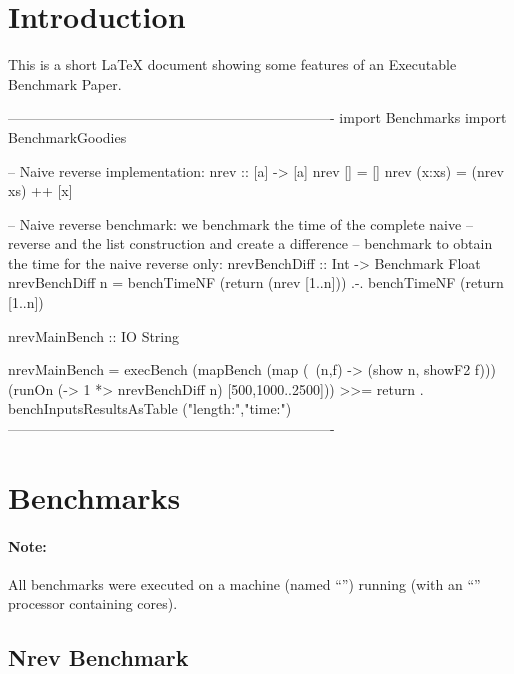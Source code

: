 \documentclass{article}
\begin{document}
\sloppy

\section{Introduction}

This is a short LaTeX document showing some features of an
Executable Benchmark Paper.

\begin{curryprog}
----------------------------------------------------------------------
import Benchmarks
import BenchmarkGoodies

-- Naive reverse implementation:
nrev :: [a] -> [a]
nrev []     = []
nrev (x:xs) = (nrev xs) ++ [x]

-- Naive reverse benchmark: we benchmark the time of the complete naive
-- reverse and the list construction and create a difference
-- benchmark to obtain the time for the naive reverse only:
nrevBenchDiff :: Int -> Benchmark Float
nrevBenchDiff n =
  benchTimeNF (return (nrev [1..n]))  .-.  benchTimeNF (return [1..n])

nrevMainBench :: IO String

nrevMainBench =
  execBench (mapBench (map (\ (n,f) -> (show n, showF2 f)))
               (runOn (\n -> 1 *> nrevBenchDiff n) [500,1000..2500])) >>=
    return . benchInputsResultsAsTable ("length:","time:")
----------------------------------------------------------------------
\end{curryprog}

\section{Benchmarks}

\paragraph{Note:}
%
All benchmarks were executed on a  machine
(named ``'')
running  
(with an ``'' processor containing
 cores).

\subsection{Nrev Benchmark}

\begin{center}
\end{center}
\end{document}
